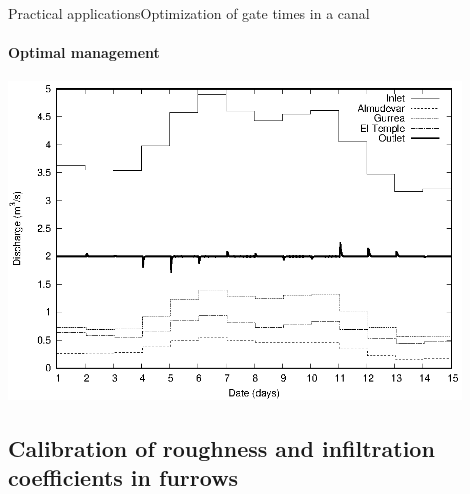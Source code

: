 \documentclass[10pt]{beamer}
\begin{document}
\begin{frame}{Practical applications}{Optimization of gate times in a canal}
	\framesubtitle{Optimal management}
	\includegraphics[width=0.9\textwidth]{Violada-optimized-contributions.eps}
\end{frame}

\subsection{Calibration of roughness and infiltration
coefficients in furrows}
\end{document}
